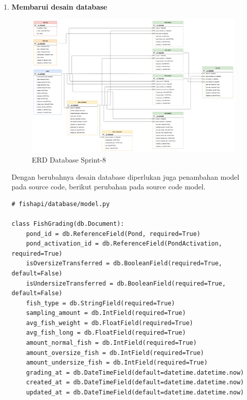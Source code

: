\begin{enumerate}[1.]

\item \textbf{Membarui desain database}

\begin{figure}[H]
	\centering
	\includegraphics[height=0.7\textwidth]{gambar/Sprint08/diagram database/database}
	\caption{ERD Database Sprint-8}
	\label{fig:database_sprint8}
\end{figure}

Dengan berubahnya desain database diperlukan juga penambahan model pada source code, berikut perubahan pada source code model.

\begin{lstlisting}
# fishapi/database/model.py

class FishGrading(db.Document):
    pond_id = db.ReferenceField(Pond, required=True)
    pond_activation_id = db.ReferenceField(PondActivation, required=True)
    isOversizeTransferred = db.BooleanField(required=True, default=False)
    isUndersizeTransferred = db.BooleanField(required=True, default=False)
    fish_type = db.StringField(required=True)
    sampling_amount = db.IntField(required=True)
    avg_fish_weight = db.FloatField(required=True)
    avg_fish_long = db.FloatField(required=True)
    amount_normal_fish = db.IntField(required=True)
    amount_oversize_fish = db.IntField(required=True)
    amount_undersize_fish = db.IntField(required=True)
    grading_at = db.DateTimeField(default=datetime.datetime.now)
    created_at = db.DateTimeField(default=datetime.datetime.now)
    updated_at = db.DateTimeField(default=datetime.datetime.now)
\end{lstlisting}




\end{enumerate}
